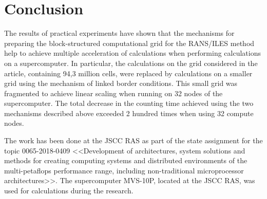 \documentclass[
11pt,%
tightenlines,%
twoside,%
onecolumn,%
nofloats,%
nobibnotes,%
nofootinbib,%
superscriptaddress,%
noshowpacs,%
centertags]%
{revtex4}
\begin{document}
\section{Conclusion}

The results of practical experiments have shown that the mechanisms for preparing the block-structured computational grid for the RANS/ILES method help to achieve multiple acceleration of calculations when performing calculations on a supercomputer.
In particular, the calculations on the grid considered in the article, containing 94,3 million cells, were replaced by calculations on a smaller grid using the mechanism of linked border conditions.
This small grid was fragmented to achieve linear scaling when running on 32 nodes of the supercomputer.
The total decrease in the counting time achieved using the two mechanisms described above exceeded 2 hundred times when using 32 compute nodes.

\begin{acknowledgments}
The work has been done at the JSCC RAS as part of the state assignment for the topic 0065-2018-0409 <<Development of architectures, system solutions and methods for creating computing systems and distributed environments of the multi-petaflops performance range, including non-traditional microprocessor architectures>>. The supercomputer MVS-10P, located at the JSCC RAS, was used for calculations during the research.
\end{acknowledgments}
\end{document}
